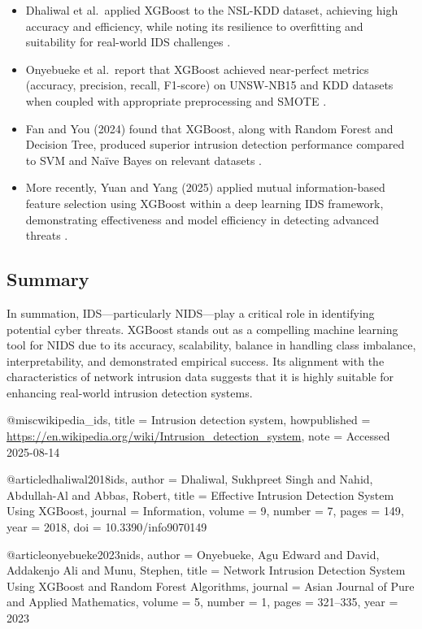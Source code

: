 \begin{itemize}
  \item Dhaliwal et al.\ applied XGBoost to the NSL-KDD dataset, achieving high accuracy and efficiency, while noting its resilience to overfitting and suitability for real-world IDS challenges \parencite{turn0search0}.
  \item Onyebueke et al.\ report that XGBoost achieved near-perfect metrics (accuracy, precision, recall, F1-score) on UNSW-NB15 and KDD datasets when coupled with appropriate preprocessing and SMOTE \parencite{turn0search1}.
  \item Fan and You (2024) found that XGBoost, along with Random Forest and Decision Tree, produced superior intrusion detection performance compared to SVM and Naïve Bayes on relevant datasets \parencite{turn0search3}.
  \item More recently, Yuan and Yang (2025) applied mutual information-based feature selection using XGBoost within a deep learning IDS framework, demonstrating effectiveness and model efficiency in detecting advanced threats \parencite{turn0search5}.
\end{itemize}

\subsection{Summary}

In summation, IDS—particularly NIDS—play a critical role in identifying potential cyber threats. XGBoost stands out as a compelling machine learning tool for NIDS due to its accuracy, scalability, balance in handling class imbalance, interpretability, and demonstrated empirical success. Its alignment with the characteristics of network intrusion data suggests that it is highly suitable for enhancing real-world intrusion detection systems.


@misc{wikipedia_ids,
  title = {Intrusion detection system},
  howpublished = {\url{https://en.wikipedia.org/wiki/Intrusion_detection_system}},
  note = {Accessed 2025-08-14}
}

@article{dhaliwal2018ids,
  author = {Dhaliwal, Sukhpreet Singh and Nahid, Abdullah-Al and Abbas, Robert},
  title = {Effective Intrusion Detection System Using XGBoost},
  journal = {Information},
  volume = {9},
  number = {7},
  pages = {149},
  year = {2018},
  doi = {10.3390/info9070149}
}

@article{onyebueke2023nids,
  author = {Onyebueke, Agu Edward and David, Addakenjo Ali and Munu, Stephen},
  title = {Network Intrusion Detection System Using XGBoost and Random Forest Algorithms},
  journal = {Asian Journal of Pure and Applied Mathematics},
  volume = {5},
  number = {1},
  pages = {321–335},
  year = {2023}
}

